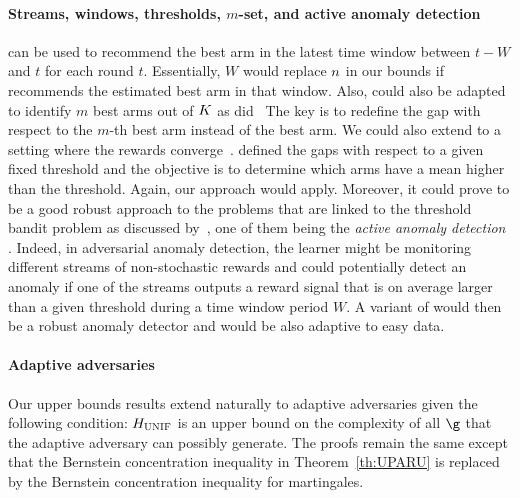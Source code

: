 \paragraph{Streams, windows, thresholds, $m$-set, and active 
	anomaly detection}
\Pone{} can  be used to
recommend  the  best arm in 
the latest time window 
between  $t-W$ and $t$ for each round $t$. Essentially, $W$ would replace $n$ in our bounds if \Pone{} recommends the estimated best arm in that window. Also, \Pone{} could also be adapted to identify $m$ best arms out of $K$ as did~\cite{Bubeck12MI}
The key is to redefine the gap with respect to the $m$-th best arm instead of the best arm.
We could also extend \Pone{} to a setting where the rewards converge~\citep{Li16HA}.
\cite{Locatelli16AO} defined the gaps with respect 
to a given fixed threshold and the objective is to determine which arms have 
a mean higher than the threshold. Again, our approach would apply. Moreover, it could prove to be a good 
robust approach to the problems that are linked to the 
threshold bandit problem as discussed by~\citet[Section~3]{Locatelli16AO}, one of them being the \emph{active anomaly detection} \citep{carpentier2014extreme}. %
Indeed, in adversarial anomaly detection, the learner might be monitoring 
different streams of non-stochastic rewards and could potentially detect an 
anomaly if one of the streams outputs a reward signal that is on average larger
than a given threshold during a time window period $W.$ A variant of \Pone{} would then be a robust anomaly detector and would be also adaptive to easy data.
%
\paragraph{Adaptive adversaries} Our upper bounds results extend 
naturally  to adaptive adversaries given the following condition:  
$H_{{\normalfont \textsc{UNIF}}}$ is an upper bound on the complexity of 
all $\gainVector$ that the adaptive adversary can possibly generate. The proofs remain the same except that the Bernstein concentration inequality in Theorem~\ref{th:UPARU} is replaced by the Bernstein concentration inequality for martingales.
\vfil
